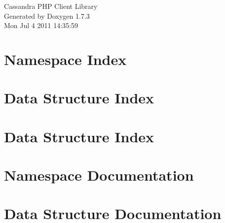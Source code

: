 \documentclass[a4paper]{book}
\begin{document}
\hypersetup{pageanchor=false}
\begin{titlepage}
\vspace*{7cm}
\begin{center}
{\Large Cassandra PHP Client Library }\\
\vspace*{1cm}
{\large Generated by Doxygen 1.7.3}\\
\vspace*{0.5cm}
{\small Mon Jul 4 2011 14:35:59}\\
\end{center}
\end{titlepage}
\clearemptydoublepage
{}
\tableofcontents
\clearemptydoublepage
{}
\hypersetup{pageanchor=true}
\chapter{Namespace Index}

\chapter{Data Structure Index}

\chapter{Data Structure Index}

\chapter{Namespace Documentation}

\chapter{Data Structure Documentation}
















\printindex
\end{document}
